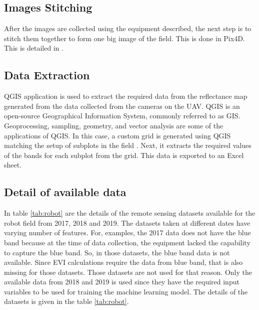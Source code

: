 \documentclass[sigconf, nonacm, natbib, screen, balance=False]{acmart}
\begin{document}
\subsection{Images Stitching}\label{sec:aspect1}

After the images are collected using the equipment described, the next step is to stitch them together to form one big image of the field. This is done in Pix4D. This is detailed in \cite{lied}.

\subsection{Data Extraction}\label{sec:aspect1}

QGIS application is used to extract the required data from the reflectance map generated from the data collected from the cameras on the UAV. QGIS is an open-source Geographical Information System, commonly referred to as GIS. Geoprocessing, sampling, geometry, and vector analysis are some of the applications of QGIS. In this case, a custom grid is generated using QGIS matching the setup of subplots in the field \cite{lied}. Next, it extracts the required values of the bands for each subplot from the grid. This data is exported to an Excel sheet. 

\subsection{Detail of available data}\label{sec:aspect1}


In table \ref{tab:robot} are the details of the remote sensing datasets available for the robot field from 2017, 2018 and 2019. The datasets taken at different dates have varying number of features. For, examples, the 2017 data does not have the blue band because at the time of data collection, the equipment lacked the capability to capture the blue band. So, in those datasets, the blue band data is not available. Since EVI calculations require the data from blue band, that is also missing for those datasets. Those datasets are not used for that reason. Only the available data from 2018 and 2019 is used since they have the required input variables to be used for training the machine learning model.
The details of the datasets is given in the table \ref{tab:robot}.
\end{document}
